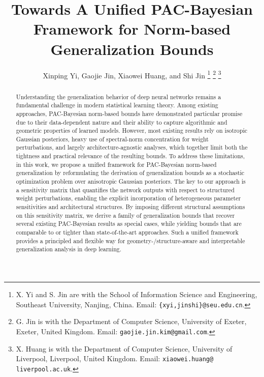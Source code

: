 \documentclass[journal]{IEEEtran} %
\title{Towards A Unified PAC-Bayesian Framework for Norm-based Generalization Bounds}
\author{Xinping Yi, Gaojie Jin, Xiaowei Huang, and Shi Jin 
\thanks{X. Yi and S. Jin are with the School of Information Science and Engineering, Southeast University, Nanjing, China. Email: \texttt{\{xyi,jinshi\}@seu.edu.cn}.}
\thanks{G. Jin is with the Department of Computer Science, University of Exeter, Exeter, United Kingdom. Email: \texttt{gaojie.jin.kim@gmail.com}.}
\thanks{X. Huang is with the Department of Computer Science, University of Liverpool, Liverpool, United Kingdom. Email: \texttt{xiaowei.huang@
liverpool.ac.uk}.}
}
\begin{document}
\maketitle

\begin{abstract}
Understanding the generalization behavior of deep neural networks remains a fundamental challenge in modern statistical learning theory. Among existing approaches, PAC-Bayesian norm-based bounds have demonstrated particular promise due to their data-dependent nature and their ability to capture algorithmic and geometric properties of learned models. However, most existing results rely on isotropic Gaussian posteriors, heavy use of spectral-norm concentration for weight perturbations, and largely architecture-agnostic analyses, which together limit both the tightness and practical relevance of the resulting bounds. To address these limitations, in this work, we propose a unified framework for PAC-Bayesian norm-based generalization by reformulating the derivation of generalization bounds as a stochastic optimization problem over anisotropic Gaussian posteriors. The key to our approach is a sensitivity matrix that quantifies the network outputs with respect to structured weight perturbations, enabling the explicit incorporation of heterogeneous parameter sensitivities and architectural structures. By imposing different structural assumptions on this sensitivity matrix, we derive a family of generalization bounds that recover several existing PAC-Bayesian results as special cases, while yielding bounds that are comparable to or tighter than state-of-the-art approaches. Such a unified framework provides a principled and flexible way for geometry-/structure-aware and interpretable generalization analysis in deep learning.
\end{abstract}

\end{document}

